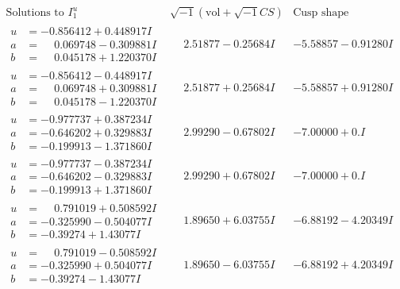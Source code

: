 \documentclass[1p]{elsarticle_modified}
\theoremstyle{definition}
\newcommand{\I}{\sqrt{-1}}
\begin{document}
$$\begin{array}{c|c|c}  
\text{Solutions to }I^u_{1}& \I (\text{vol} + \sqrt{-1}CS) & \text{Cusp shape}\\
 \hline 
\begin{aligned}
u &= -0.856412 + 0.448917 I \\
a &= \phantom{-}0.069748 - 0.309881 I \\
b &= \phantom{-}0.045178 + 1.220370 I\end{aligned}
 & \phantom{-}2.51877 - 0.25684 I & -5.58857 - 0.91280 I \\ \hline\begin{aligned}
u &= -0.856412 - 0.448917 I \\
a &= \phantom{-}0.069748 + 0.309881 I \\
b &= \phantom{-}0.045178 - 1.220370 I\end{aligned}
 & \phantom{-}2.51877 + 0.25684 I & -5.58857 + 0.91280 I \\ \hline\begin{aligned}
u &= -0.977737 + 0.387234 I \\
a &= -0.646202 + 0.329883 I \\
b &= -0.199913 - 1.371860 I\end{aligned}
 & \phantom{-}2.99290 - 0.67802 I & -7.00000 + 0. I\phantom{ +0.000000I} \\ \hline\begin{aligned}
u &= -0.977737 - 0.387234 I \\
a &= -0.646202 - 0.329883 I \\
b &= -0.199913 + 1.371860 I\end{aligned}
 & \phantom{-}2.99290 + 0.67802 I & -7.00000 + 0. I\phantom{ +0.000000I} \\ \hline\begin{aligned}
u &= \phantom{-}0.791019 + 0.508592 I \\
a &= -0.325990 - 0.504077 I \\
b &= -0.39274 + 1.43077 I\end{aligned}
 & \phantom{-}1.89650 + 6.03755 I & -6.88192 - 4.20349 I \\ \hline\begin{aligned}
u &= \phantom{-}0.791019 - 0.508592 I \\
a &= -0.325990 + 0.504077 I \\
b &= -0.39274 - 1.43077 I\end{aligned}
 & \phantom{-}1.89650 - 6.03755 I & -6.88192 + 4.20349 I \\ \hline\begin{aligned}

\end{aligned}
\end{array}$$
\end{document}
